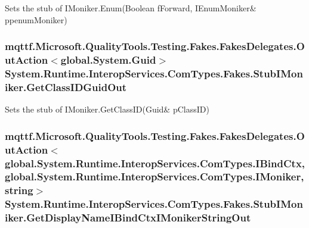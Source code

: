 Sets the stub of I\-Moniker.\-Enum(Boolean f\-Forward, I\-Enum\-Moniker\& ppenum\-Moniker)

\hypertarget{class_system_1_1_runtime_1_1_interop_services_1_1_com_types_1_1_fakes_1_1_stub_i_moniker_a03148046961c518b5f2bd8af0ca88053}{
\subsubsection[{Get\-Class\-I\-D\-Guid\-Out}]{\setlength{\rightskip}{0pt plus 5cm}mqttf.\-Microsoft.\-Quality\-Tools.\-Testing.\-Fakes.\-Fakes\-Delegates.\-Out\-Action$<$global.\-System.\-Guid$>$ System.\-Runtime.\-Interop\-Services.\-Com\-Types.\-Fakes.\-Stub\-I\-Moniker.\-Get\-Class\-I\-D\-Guid\-Out}}\label{class_system_1_1_runtime_1_1_interop_services_1_1_com_types_1_1_fakes_1_1_stub_i_moniker_a03148046961c518b5f2bd8af0ca88053}


Sets the stub of I\-Moniker.\-Get\-Class\-I\-D(Guid\& p\-Class\-I\-D)

\hypertarget{class_system_1_1_runtime_1_1_interop_services_1_1_com_types_1_1_fakes_1_1_stub_i_moniker_ac404d987eb628e569c56ae281a7a4c9b}{
\subsubsection[{Get\-Display\-Name\-I\-Bind\-Ctx\-I\-Moniker\-String\-Out}]{\setlength{\rightskip}{0pt plus 5cm}mqttf.\-Microsoft.\-Quality\-Tools.\-Testing.\-Fakes.\-Fakes\-Delegates.\-Out\-Action$<$global.\-System.\-Runtime.\-Interop\-Services.\-Com\-Types.\-I\-Bind\-Ctx, global.\-System.\-Runtime.\-Interop\-Services.\-Com\-Types.\-I\-Moniker, string$>$ System.\-Runtime.\-Interop\-Services.\-Com\-Types.\-Fakes.\-Stub\-I\-Moniker.\-Get\-Display\-Name\-I\-Bind\-Ctx\-I\-Moniker\-String\-Out}}\label{class_system_1_1_runtime_1_1_interop_services_1_1_com_types_1_1_fakes_1_1_stub_i_moniker_ac404d987eb628e569c56ae281a7a4c9b}



